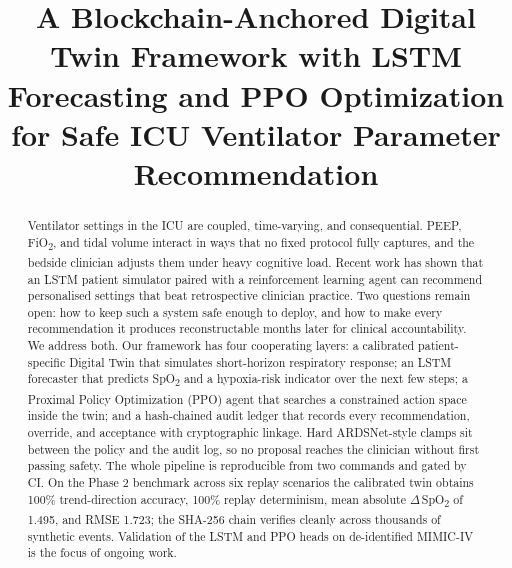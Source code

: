 \documentclass[conference]{IEEEtran}
\begin{document}
\title{A Blockchain-Anchored Digital Twin Framework with LSTM Forecasting and PPO Optimization for Safe ICU Ventilator Parameter Recommendation}

\author{%
  \and
}

\maketitle

\begin{abstract}
Ventilator settings in the ICU are coupled, time-varying, and consequential. PEEP, FiO\textsubscript{2}, and tidal volume interact in ways that no fixed protocol fully captures, and the bedside clinician adjusts them under heavy cognitive load. Recent work has shown that an LSTM patient simulator paired with a reinforcement learning agent can recommend personalised settings that beat retrospective clinician practice. Two questions remain open: how to keep such a system safe enough to deploy, and how to make every recommendation it produces reconstructable months later for clinical accountability. We address both. Our framework has four cooperating layers: a calibrated patient-specific Digital Twin that simulates short-horizon respiratory response; an LSTM forecaster that predicts SpO\textsubscript{2} and a hypoxia-risk indicator over the next few steps; a Proximal Policy Optimization (PPO) agent that searches a constrained action space inside the twin; and a hash-chained audit ledger that records every recommendation, override, and acceptance with cryptographic linkage. Hard ARDSNet-style clamps sit between the policy and the audit log, so no proposal reaches the clinician without first passing safety. The whole pipeline is reproducible from two commands and gated by CI. On the Phase 2 benchmark across six replay scenarios the calibrated twin obtains 100\% trend-direction accuracy, 100\% replay determinism, mean absolute $\Delta$\,SpO\textsubscript{2} of 1.495, and RMSE 1.723; the SHA-256 chain verifies cleanly across thousands of synthetic events. Validation of the LSTM and PPO heads on de-identified MIMIC-IV is the focus of ongoing work.
\end{abstract}
\end{document}
